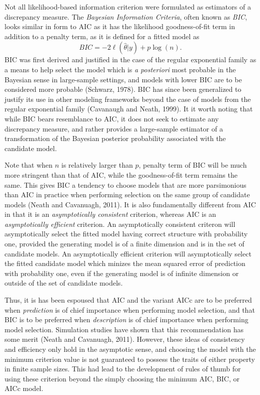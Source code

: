 		Not all likelihood-based information criterion were formulated as estimators of a discrepancy measure. The \textit{Bayesian Information Criteria}, often known as \textit{BIC}, looks similar in
		form to AIC as it has the likelihood goodness-of-fit term in addition to a penalty term, as it is defined for a fitted model as
		\begin{equation}
			BIC = -2 \ell(\hat{\theta}|y) + p \log (n).
		\end{equation}
		BIC was first derived and justified in the case of the regular exponential family as a means to help select the model which is \textit{a posteriori} most probable in the Bayesian sense in
		large-sample settings, and models with lower BIC are to be considered more probable (Schwarz, 1978). BIC has since been generalized to justify its use in other modeling frameworks beyond
		the case of models from the regular exponential family (Cavanaugh and Neath, 1999). It it worth noting that while BIC bears resemblance to AIC, it does not seek to estimate any discrepancy
		measure, and rather provides a large-sample estimator of a transformation of the Bayesian posterior probability associated with the candidate model.

		Note that when $n$ is relatively larger than $p$, penalty term of BIC will be much more stringent than that of AIC, while the goodness-of-fit term remains the same. This gives BIC a tendency to
		choose models that are more parsimonious than AIC in practice when performing selection on the same group of candidate models (Neath and Cavanuagh, 2011). It is also fundamentally different
		from AIC in that it is an \textit{asymptotically consistent} criterion,  whereas AIC is an \textit{asymptotically efficient} criterion. An asymptotically consistent criteron will asymptotically
		select the fitted model having correct structure with probability one, provided the generating model is of a finite dimension and is in the set of candidate models. An asymptotically efficient
		criterion will asymptotically select the fitted candidate model which minizes the mean squared error of prediction with probability one, even if the generating model is of infinite dimension or outside of the
		set of candidate models.

		Thus, it is has been espoused that AIC and the variant AICc are to be preferred when \textit{prediction} is of chief importance when performing model selection, and that BIC is to be preferred
		when \textit{description} is of chief importance when performing model selection. Simulation studies have shown that this recommendation has some merit (Neath and Cavanuagh, 2011). However, these
		ideas of consistency and efficiency only hold in the asymptotic sense, and choosing the model with the minimum criterion value is not guaranteed to possess the traits of either property in
		finite sample sizes. This had lead to the development of rules of thumb for using these criterion beyond the simply choosing the minimum AIC, BIC, or AICc model.

